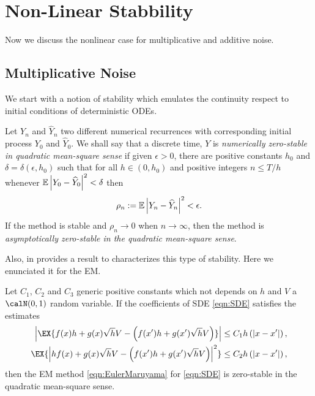 \section*{Non-Linear Stabbility}	
	Now we discuss the nonlinear case for multiplicative and additive noise. 
	\subsection*{Multiplicative Noise}
	We start with a notion of stability	which emulates the continuity respect to initial conditions of deterministic 
	ODEs.
	\begin{dfn}\label{dfn:SNMS}
		Let $Y_n$ and $\widehat{Y}_n$ two different numerical recurrences  with
		corresponding initial process  $Y_0$ and $\widehat{Y}_0$. We shall say that a
		discrete time, $Y$ is \emph{numerically zero-stable in quadratic mean-square sense} if given
		$\epsilon >0$, there  are positive constants $h_0$ and $\delta=\delta(\epsilon,h_0)$
		such that for all $h\in(0,h_0)$ and positive integers $n \leq T/h$ whenever
		$\mathbb{E}\left|Y_0-\widehat{Y}_0\right|^2<\delta$ then
		\begin {eqnarray}\label{eqn:SNMS}
		\rho_n :=
		\mathbb{E}\left|Y_n-\widehat{Y}_{n}\right|^2<\epsilon .
	\end{eqnarray}
	If the method is stable and $\rho_n \to 0$ when $n\to \infty$, then the method is
	\emph{asymptotically zero-stable in the quadratic mean-square sense}.
\end{dfn}
Also, in \cite{Baker2000a} provides a result to characterizes this type of stability. Here we
enunciated it for the EM.
\begin{thm}
	Let $C_1$, $C_2$ and $C_3$ generic positive constants which not depends on $h$ and $V$ a
	$\calN(0,1)$ random variable. 
	If the coefficients of  SDE \eqref{eqn:SDE} satisfies the estimates
	\begin{align*}
		\left|\EX{
			f(x) h +  g(x)\sqrt{h}V -
			\left(
				f(x') h + g(x')\sqrt{h}V
			\right)}	
		\right| 
		&\leq C_1h \left(|x - x'| \right), \\
		\EX{\left|
				hf(x)+g(x)\sqrt{h}V -
				\left(
				 f(x') h + g(x')\sqrt{h}V
				\right)	
			\right|^2}
			&\leq C_2 h \left(|x - x'| \right),
	\end{align*}
	then the EM method \eqref{eqn:EulerMaruyama} for \eqref{eqn:SDE} is zero-stable in the quadratic mean-square sense.
\end{thm}
